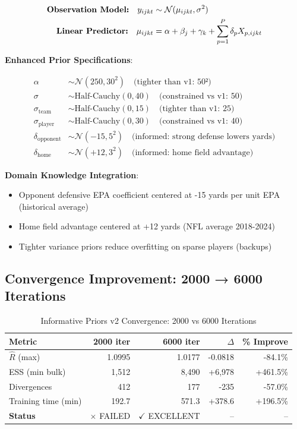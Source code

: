 \begin{align}
\text{\textbf{Observation Model:}} \quad y_{ijkt} &\sim \mathcal{N}(\mu_{ijkt}, \sigma^2) \\
\text{\textbf{Linear Predictor:}} \quad \mu_{ijkt} &= \alpha + \beta_j + \gamma_k + \sum_{p=1}^{P} \delta_p X_{p,ijkt}
\label{eq:informative-priors-spec}
\end{align}

\textbf{Enhanced Prior Specifications}:

\begin{align}
\alpha &\sim \mathcal{N}(250, 30^2) \quad \text{(tighter than v1: 50²)} \\
\sigma &\sim \text{Half-Cauchy}(0, 40) \quad \text{(constrained vs v1: 50)} \\
\sigma_{\text{team}} &\sim \text{Half-Cauchy}(0, 15) \quad \text{(tighter than v1: 25)} \\
\sigma_{\text{player}} &\sim \text{Half-Cauchy}(0, 30) \quad \text{(constrained vs v1: 40)} \\
\delta_{\text{opponent}} &\sim \mathcal{N}(-15, 5^2) \quad \text{(informed: strong defense lowers yards)} \\
\delta_{\text{home}} &\sim \mathcal{N}(+12, 3^2) \quad \text{(informed: home field advantage)}
\label{eq:informative-priors-enhanced}
\end{align}

\textbf{Domain Knowledge Integration}:
\begin{itemize}
\item Opponent defensive EPA coefficient centered at -15 yards per unit EPA (historical average)
\item Home field advantage centered at +12 yards (NFL average 2018-2024)
\item Tighter variance priors reduce overfitting on sparse players (backups)
\end{itemize}

\subsection{Convergence Improvement: 2000 → 6000 Iterations}

\begin{table}[h]
\centering
\caption{Informative Priors v2 Convergence: 2000 vs 6000 Iterations}
\label{tab:informative-priors-convergence-improvement}
\begin{tabular}{lrrrr}
\toprule
\textbf{Metric} & \textbf{2000 iter} & \textbf{6000 iter} & \textbf{$\Delta$} & \textbf{\% Improve} \\
\midrule
$\hat{R}$ (max) & 1.0995 & 1.0177 & -0.0818 & -84.1\% \\
ESS (min bulk) & 1,512 & 8,490 & +6,978 & +461.5\% \\
Divergences & 412 & 177 & -235 & -57.0\% \\
Training time (min) & 192.7 & 571.3 & +378.6 & +196.5\% \\
\midrule
\textbf{Status} & $\times$ FAILED & $\checkmark$ EXCELLENT & -- & -- \\
\bottomrule
\end{tabular}
\end{table}

